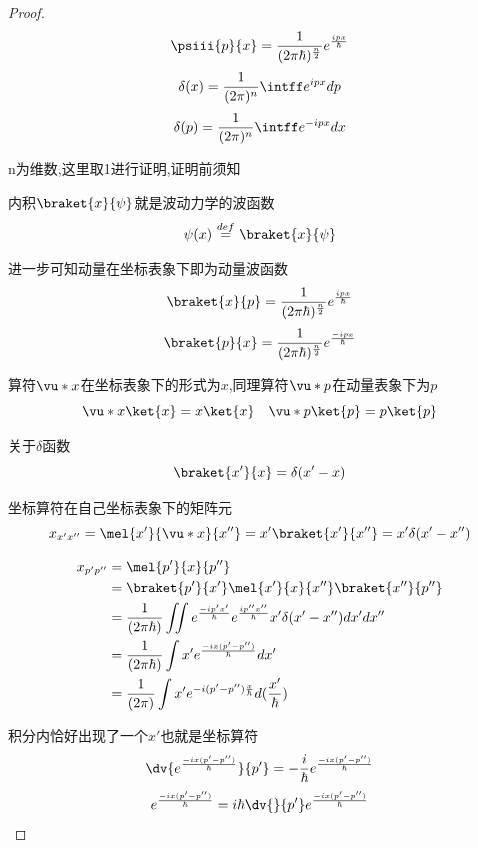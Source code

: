             \begin{proof}
                \pfindent

                $$ \psiii{p}{x} = \frac{1}{(2 \pi \hbar)^{\frac{n}{2}}} e^{\frac{ipx}{\hbar}} $$ 
                $$ \delta(x) = \frac{1}{(2\pi)^{n}} \intff e^{ipx} dp $$
                $$ \delta(p) = \frac{1}{(2\pi)^{n}} \intff e^{-ipx} dx $$

                n为维数,这里取1进行证明,证明前须知
                
                内积$\braket{x}{\psi}$就是波动力学的波函数
                $$\psi (x)\ {\stackrel {def}{=}}\ \braket{x}{\psi}$$
                
                进一步可知动量在坐标表象下即为动量波函数
                $$ \braket{x}{p} = \frac{1}{(2 \pi \hbar)^{\frac{n}{2}}} e^{\frac{ipx}{\hbar}} $$
                $$ \braket{p}{x} = \frac{1}{(2 \pi \hbar)^{\frac{n}{2}}} e^{\frac{-ipx}{\hbar}} $$

                算符$\vu*{x}$在坐标表象下的形式为$x$,同理算符$\vu*{p}$在动量表象下为$p$
                $${\vu*{x}} \ket{x}= x \ket{x} \quad {\vu*{p}} \ket{p} = p \ket{p} $$

                关于$\delta$函数
                $$ \braket{x'}{x} = \delta(x'-x) $$

                坐标算符在自己坐标表象下的矩阵元
                $$ x_{x'x''} = \mel{x'}{\vu*{x}}{x''} = x' \braket{x'}{x''} = x' \delta(x'-x'') $$

                \begin{align*}
                    x_{p'p''} &= \mel{p'}{x}{p''} \\
                            &= \braket{p'}{x'} \mel{x'}{x}{x''} \braket{x''}{p''}                                                                  \\
                            &= \frac{1}{(2 \pi \hbar)} \iint e^{\frac{-ip' x'}{\hbar}}  e^{\frac{ip''x''}{\hbar}} x' \delta(x'-x'') dx'dx''          \\
                            &= \frac{1}{(2 \pi \hbar)} \int x' e^{\frac{-ix(p'-p'')}{\hbar}}   dx'                                                   \\
                            &= \frac{1}{(2 \pi)} \int x' e^{-i(p'-p'')\frac{x}{\hbar}}   d(\frac{x'}{\hbar})
                \end{align*}

                积分内恰好出现了一个$x'$也就是坐标算符
                $$ \dv{e^{\frac{-ix(p'-p'')}{\hbar}}}{p'} = -\frac{i}{\hbar} e^{\frac{-ix(p'-p'')}{\hbar}}$$
                $$ e^{\frac{-ix(p'-p'')}{\hbar}} = i\hbar \dv{}{p'} e^{\frac{-ix(p'-p'')}{\hbar}}$$
                

\end{proof}
